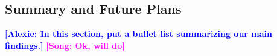 \documentclass{emulateapj}
\def\redm{\texttt{redMaPPer}}
\def\nbcg{\texttt{cenLowMh}}
\def\mstar{{$M_{\star}$}}
\newcommand{\addref}{{\textcolor{red}{REF}}}
\newcommand{\song}[1]{\textcolor{magenta}{\textbf{[Song: #1]}}}
\newcommand{\alexie}[1]{\textcolor{blue}{\textbf{[Alexie: #1]}}}
\begin{document}
\begin{CJK*}{UTF8}{gbsn}
%
%    
%    


\section{Summary and Future Plans}
    \label{sec:summary}
\alexie{In this section, put a bullet list summarizing our main findings.}
	\song{Ok, will do}


\end{CJK*}
\end{document}
